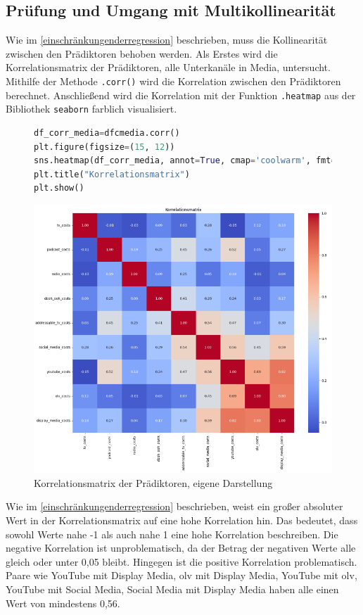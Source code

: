 \subsection{Prüfung und Umgang mit Multikollinearität}
\label{PrüfungUndUmgangMitMultikollinearität}
Wie im \autoref{einschränkungenderregression} beschrieben, muss die Kollinearität zwischen den Prädiktoren behoben werden. Als Erstes wird die Korrelationsmatrix der Prädiktoren, alle Unterkanäle in Media, untersucht. Mithilfe der Methode \verb|.corr()| wird die Korrelation zwischen den Prädiktoren berechnet. Anschließend wird die Korrelation mit der Funktion \verb|.heatmap| aus der Bibliothek \verb|seaborn| farblich visualisiert.
\begin{figure}[H]
    \centering
    \begin{lstlisting}[language=Python, linewidth=\textwidth]
df_corr_media=dfcmedia.corr() 
plt.figure(figsize=(15, 12))
sns.heatmap(df_corr_media, annot=True, cmap='coolwarm', fmt=".2f")
plt.title("Korrelationsmatrix")
plt.show()
\end{lstlisting}
    \includegraphics[width=0.9\linewidth]{images/korrelationsmatrix.png}
    \caption{Korrelationsmatrix der Prädiktoren, eigene Darstellung}
    \label{fig:korrelationsmatrix}
\end{figure}
Wie im \autoref{einschränkungenderregression} beschrieben, weist ein großer absoluter Wert in der Korrelationsmatrix auf eine hohe Korrelation hin. Das bedeutet, dass sowohl Werte nahe -1 als auch nahe 1 eine hohe Korrelation beschreiben. Die negative Korrelation ist unproblematisch, da der Betrag der negativen Werte alle gleich oder unter 0,05 bleibt. Hingegen ist die positive Korrelation problematisch. Paare wie YouTube mit Display Media, \ac{olv} mit Display Media, YouTube mit \ac{olv}, YouTube mit Social Media, Social Media mit Display Media haben alle einen Wert von mindestens 0,56. \par
